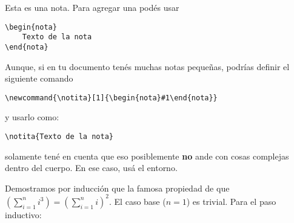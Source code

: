 \documentclass[debug,practica]{lcc}
\begin{document}
\begin{nota}
    Esta es una nota. Para agregar una podés usar
\begin{verbatim}
\begin{nota}
    Texto de la nota
\end{nota}
\end{verbatim}
    Aunque, si en tu documento tenés muchas notas pequeñas, podrías definir el siguiente comando
\begin{verbatim}
\newcommand{\notita}[1]{\begin{nota}#1\end{nota}}
\end{verbatim}
    y usarlo como:
\begin{verbatim}
\notita{Texto de la nota}
\end{verbatim}
    solamente tené en cuenta que eso posiblemente \textbf{no} ande
    con cosas complejas dentro del cuerpo. En ese caso, usá el entorno.
\end{nota}

\begin{ejemplo}
    Demostramos por inducción que la famosa propiedad de que
    $\left(\sum_{i=1}^n i^3\right) = \left(\sum_{i=1}^n i\right)^2$.
    El caso base ($n = 1$) es trivial. Para el paso inductivo:
    \begin{calc}
    \end{calc}
\end{ejemplo}
\end{document}
